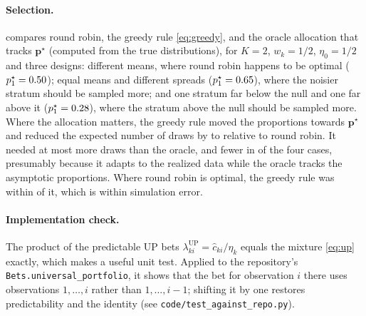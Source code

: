 \documentclass[11pt]{article}
\newcommand{\bs}{\boldsymbol}
\newcommand{\up}{\mathrm{UP}}
\theoremstyle{plain}
\theoremstyle{definition}
\theoremstyle{remark}
\begin{document}
\paragraph{Selection.}   compares round robin, the greedy rule \eqref{eq:greedy}, and the oracle
allocation that tracks $\bs p^\star$ (computed from the true distributions), for $K=2$, $w_k=1/2$, $\eta_0=1/2$ and three
designs: different means, where round robin happens to be optimal ($p^\star_1=0.50$); equal means and different
spreads ($p^\star_1=0.65$), where the noisier stratum should be sampled more; and one stratum far below the null and
one far above it ($p^\star_1=0.28$), where the stratum above the null should be sampled more.  Where the allocation
matters, the greedy rule moved the proportions towards $\bs p^\star$ and reduced the expected number of draws by
\iselgainmin{} to \iselgainmax{} relative to round robin.  It needed at most \iselvsoraclemax{} more draws than the oracle,
and fewer in \iselbeatoracle{} of the four cases, presumably because it adapts to the realized data while the oracle
tracks the asymptotic proportions.  Where round robin is optimal, the greedy rule was within \iselmeansdiff{} of it,
which is within simulation error.

\begin{table}[t]
  \centering\small
  \caption{Selection rules for $K=2$, $w_k=1/2$, $\eta_0=1/2$, \repsI{} replications; strata are
  $\mathrm{Beta}(\kappa\mu_k,\kappa(1-\mu_k))$ with the means $\mu_k$ and concentrations $\kappa$ shown.  Expected number of draws
  to reject at level $5\%$, and the average share of draws taken from stratum 1.  Oracle: deterministic allocation
  tracking the optimal proportions $\bs p^\star$.}
  \label{tab:selection}
  
\end{table}

\paragraph{Implementation check.}  The product of the predictable UP bets $\lambda^{\up}_{ki}=\hat c_{ki}/\eta_k$ equals the
mixture \eqref{eq:up} exactly, which makes a useful unit test.  Applied to the repository's
\texttt{Bets.universal\_portfolio}, it shows that the bet for observation $i$ there uses observations $1,\ldots,i$ rather
than $1,\ldots,i-1$; shifting it by one restores predictability and the identity (see \texttt{code/test\_against\_repo.py}).

\end{document}
